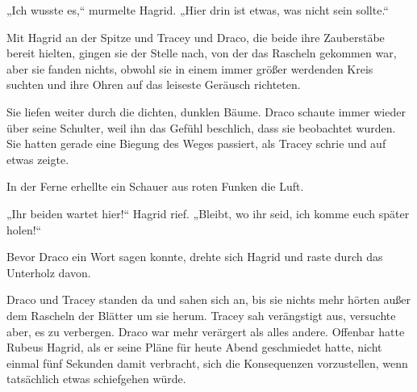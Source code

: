 „Ich wusste es,“ murmelte Hagrid. „Hier drin ist etwas, was nicht sein sollte.“

Mit Hagrid an der Spitze und Tracey und Draco, die beide ihre Zauberstäbe bereit hielten, gingen sie der Stelle nach, von der das Rascheln gekommen war, aber sie fanden nichts, obwohl sie in einem immer größer werdenden Kreis suchten und ihre Ohren auf das leiseste Geräusch richteten.

Sie liefen weiter durch die dichten, dunklen Bäume. Draco schaute immer wieder über seine Schulter, weil ihn das Gefühl beschlich, dass sie beobachtet wurden. Sie hatten gerade eine Biegung des Weges passiert, als Tracey schrie und auf etwas zeigte.

In der Ferne erhellte ein Schauer aus roten Funken die Luft.

„Ihr beiden wartet hier!“ Hagrid rief. „Bleibt, wo ihr seid, ich komme euch später holen!“

Bevor Draco ein Wort sagen konnte, drehte sich Hagrid und raste durch das Unterholz davon.

Draco und Tracey standen da und sahen sich an, bis sie nichts mehr hörten außer dem Rascheln der Blätter um sie herum. Tracey sah verängstigt aus, versuchte aber, es zu verbergen. Draco war mehr verärgert als alles andere. Offenbar hatte Rubeus Hagrid, als er seine Pläne für heute Abend geschmiedet hatte, nicht einmal fünf Sekunden damit verbracht, sich die Konsequenzen vorzustellen, wenn tatsächlich etwas schiefgehen würde.


